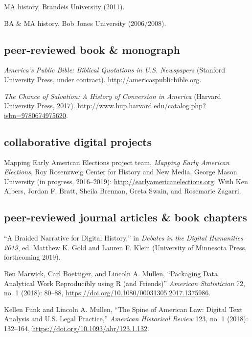 \documentclass[11pt]{article}
\begin{document}
\vspace{0.05in}

MA history, Brandeis University (2011).

BA \& MA history, Bob Jones University (2006/2008).

\subsection{peer-reviewed book \& monograph}\label{books}

\emph{America's Public Bible: Biblical Quotations in U.S. Newspapers} 
(Stanford University Press, under contract). 
\url{http://americaspublicbible.org}.

\emph{The Chance of Salvation: A History of Conversion in America} (Harvard 
University Press, 2017). 
\url{http://www.hup.harvard.edu/catalog.php?isbn=9780674975620}.

\subsection{collaborative digital projects}\label{digital projects}

Mapping Early American Elections project team, \emph{Mapping Early American Elections}, Roy Rosenzweig Center for History and New Media, George Mason University (in progress, 2016--2019): \url{http://earlyamericanelections.org}. With Ken Albers, Jordan F. Bratt, Sheila Brennan, Greta Swain, and Rosemarie Zagarri.

\subsection{peer-reviewed journal articles \& book chapters}\label{peer-reviewed}

``A Braided Narrative for Digital History,'' in \emph{Debates in the Digital Humanities 2019}, ed. Matthew K. Gold and Lauren F. Klein (University of Minnesota Press, forthcoming 2019).

Ben Marwick, Carl Boettiger, and Lincoln A. Mullen, ``Packaging Data 
Analytical Work Reproducibly using R (and Friends)'' \emph{American 
Statistician} 72, no. 1 (2018): 80--88, \url{https://doi.org/10.1080/00031305.2017.1375986}.

Kellen Funk and Lincoln A. Mullen, ``The Spine of American Law: Digital Text Analysis and U.S. Legal Practice,'' \emph{American Historical Review} 123, no.  1 (2018): 132--164, \url{https://doi.org/10.1093/ahr/123.1.132}.
\end{document}

